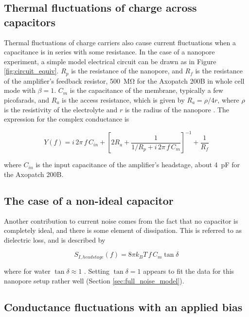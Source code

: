 \subsection{Thermal fluctuations of charge across capacitors}

Thermal fluctuations of charge carriers also cause current fluctuations when a capacitance is in series with some resistance.  In the case of a nanopore experiment, a simple model electrical circuit can be drawn as in Figure \ref{fig:circuit_equiv}.  $R_p$ is the resistance of the nanopore, and $R_f$ is the resistance of the amplifier's feedback resistor, \SI{500}{\mega\ohm} for the Axopatch 200B in whole cell mode with $\beta = 1$.  $C_m$ is the capacitance of the membrane, typically a few picofarads, and $R_a$ is the access resistance, which is given by $R_a = \rho/4r$, where $\rho$ is the resistivity of the electrolyte and $r$ is the radius of the nanopore \citep{Hall1975}.  The expression for the complex conductance is

\begin{equation}
Y(f) = i \, 2 \pi \, f \, C_{in} + \left[ 2 R_a + \frac{1}{ 1/R_p + i \, 2 \pi \, f \, C_m } \right]^{-1} + \frac{1}{R_f}
\label{eqn:admittance_model}
\end{equation}

\noindent
where $C_{in}$ is the input capacitance of the amplifier's headstage, about \SI{4}{\pF} for the Axopatch 200B.

\subsection{The case of a non-ideal capacitor}

Another contribution to current noise comes from the fact that no capacitor is completely ideal, and there is some element of dissipation.  This is referred to as dielectric loss, and is described by \citep{Sakmann1995}

\begin{equation}
S_{I,headstage}(f) = 8 \pi k_B T \, f \, C_m \tan \delta
\label{eqn:dielectric}
\end{equation}

\noindent
where for water $\tan \delta \approx 1$ \citep{Gaiduk2006,Hoogerheide2010}.  Setting $\tan \delta = 1$ appears to fit the data for this nanopore setup rather well (Section \ref{sec:full_noise_model}).

\subsection{Conductance fluctuations with an applied bias}

